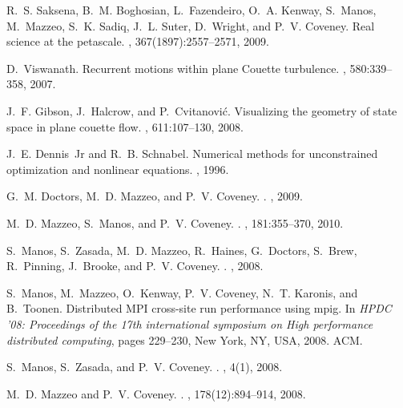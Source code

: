 \begin{thebibliography}{10}
R.~S. Saksena, B.~M. Boghosian, L.~Fazendeiro, O.~A. Kenway, S.~Manos,
  M.~Mazzeo, S.~K. Sadiq, J.~L. Suter, D.~Wright, and P.~V. Coveney.
\newblock Real science at the petascale.
, 367(1897):2557--2571, 2009.

D.~Viswanath.
\newblock Recurrent motions within plane {Couette} turbulence.
, 580:339--358, 2007.

J.~F. Gibson, J.~Halcrow, and P.~Cvitanovi\'{c}.
\newblock Visualizing the geometry of state space in plane couette flow.
, 611:107--130, 2008.

J.~E. Dennis~Jr and R.~B. Schnabel.
\newblock Numerical methods for unconstrained optimization and nonlinear
  equations.
, 1996.

G.~M. Doctors, M.~D. Mazzeo, and P.~V. Coveney.
.
, 2009.

M.~D. Mazzeo, S.~Manos, and P.~V. Coveney.
.
, 181:355--370, 2010.

S.~Manos, S.~Zasada, M.~D. Mazzeo, R.~Haines, G.~Doctors, S.~Brew, R.~Pinning,
  J.~Brooke, and P.~V. Coveney.
.
, 2008.

S.~Manos, M.~Mazzeo, O.~Kenway, P.~V. Coveney, N.~T. Karonis, and B.~Toonen.
\newblock Distributed {MPI} cross-site run performance using mpig.
\newblock In {\em HPDC '08: Proceedings of the 17th international symposium on
  High performance distributed computing}, pages 229--230, New York, NY, USA,
  2008. ACM.

S.~Manos, S.~Zasada, and P.~V. Coveney.
.
, 4(1), 2008.

M.~D. Mazzeo and P.~V. Coveney.
.
, 178(12):894--914, 2008.


\end{thebibliography}
